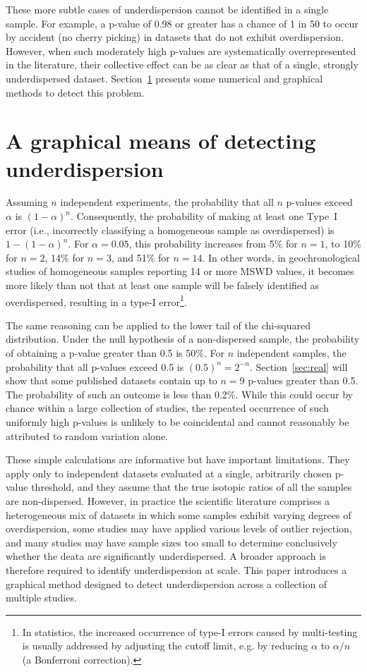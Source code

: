 \documentclass[gchron, manuscript]{copernicus}
\begin{document}
These more subtle cases of underdispersion cannot be identified in a
single sample. For example, a p-value of 0.98 or greater has a chance
of 1 in 50 to occur by accident (no cherry picking) in datasets that
do not exhibit overdispersion. However, when such moderately high
p-values are systematically overrepresented in the literature, their
collective effect can be as clear as that of a single, strongly
underdispersed dataset. Section~\ref{sec:ecdf} presents some numerical
and graphical methods to detect this problem.

\section{A graphical means of detecting underdispersion}\label{sec:ecdf}

Assuming $n$ independent experiments, the probability that all $n$
p-values exceed $\alpha$ is $(1-\alpha)^n$.  Consequently, the
probability of making at least one Type~I error (i.e., incorrectly
classifying a homogeneous sample as overdispersed) is $1 - (1 -
\alpha)^n$. For $\alpha=0.05$, this probability increases from 5\% for
$n = 1$, to 10\% for $n = 2$, 14\% for $n = 3$, and 51\% for $n =
14$. In other words, in geochronological studies of homogeneous
samples reporting 14 or more MSWD values, it becomes more likely than
not that at least one sample will be falsely identified as
overdispersed, resulting in a type-I error\footnote{In statistics, the
increased occurrence of type-I errors caused by multi-testing is
usually addressed by adjusting the cutoff limit, e.g. by reducing
$\alpha$ to $\alpha/n$ (a Bonferroni correction).}.\medskip

The same reasoning can be applied to the lower tail of the chi-squared
distribution. Under the null hypothesis of a non-dispersed sample, the
probability of obtaining a p-value greater than 0.5 is 50\%. For $n$
independent samples, the probability that all p-values exceed 0.5 is
$(0.5)^n = 2^{-n}$. Section~\ref{sec:real} will show that some
published datasets contain up to $n = 9$ p-values greater than
0.5. The probability of such an outcome is less than 0.2\%. While this
could occur by chance within a large collection of studies, the
repeated occurrence of such uniformly high p-values is unlikely to be
coincidental and cannot reasonably be attributed to random variation
alone.\medskip

These simple calculations are informative but have important
limitations. They apply only to independent datasets evaluated at a
single, arbitrarily chosen p-value threshold, and they assume that the
true isotopic ratios of all the samples are non-dispersed. However, in
practice the scientific literature comprises a heterogeneous mix of
datasets in which some samples exhibit varying degrees of
overdispersion, some studies may have applied various levels of
outlier rejection, and many studies may have sample sizes too small to
determine conclusively whether the deata are significantly
underdispersed. A broader approach is therefore required to identify
underdispersion at scale. This paper introduces a graphical method
designed to detect underdispersion across a collection of multiple
studies.\medskip
\end{document}

